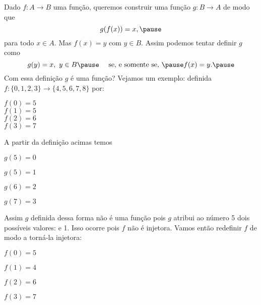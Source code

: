 \documentclass{beamer}
\begin{document}
    \begin{frame}
        Dado $f : A \to B$ \pause uma função, \pause queremos construir uma função $g : B \to A$ \pause de modo que
        \[
            g(f(x)) = x,\pause
        \]
        para todo $x \in A$. \pause Mas $f(x) = y$ \pause com $y \in B$. \pause Assim podemos tentar definir $g$ \pause como
        \[
            g(y) = x,\ y \in B \pause \quad \mbox{ se, e somente se, } \pause f(x) = y.\pause
        \]
        Com essa definição \pause $g$ é uma função? \pause Vejamos um exemplo: \pause definida $f : \{0,1,2,3\} \to \{4,5,6,7,8\}$ por:\pause
        \begin{center}
            $f(0) = 5$ \pause\\
            \vspace{.3cm}
            $f(1) = 5$\pause\\
            \vspace{.3cm}
            $f(2) = 6$\pause\\
            \vspace{.3cm}
            $f(3) = 7$
        \end{center}
    \end{frame}

    \begin{frame}
        A partir da definição acimas temos\pause
        \begin{center}
            $g(5) = 0 $\pause\\

            \vspace{.3cm}

            $g(5) = 1$\pause\\

            \vspace{.3cm}

            $g(6) = 2$\pause\\

            \vspace{.3cm}

            $g(7) = 3$\pause
        \end{center}

        Assim $g$ definida dessa forma \pause não é uma função \pause pois $g$ atribui ao número 5 \pause dois possíveis valores:  e 1. \pause Isso ocorre pois $f$ não é injetora. \pause Vamos então redefinir $f$ de modo a torná-la injetora:\pause
        \begin{center}
            $f(0) = 5$\pause\\

            \vspace{.3cm}

            $f(1) = 4$\pause\\

            \vspace{.3cm}

            $f(2) = 6$\pause\\

            \vspace{.3cm}

            $f(3) = 7$\pause
        \end{center}
    \end{frame}
\end{document}
